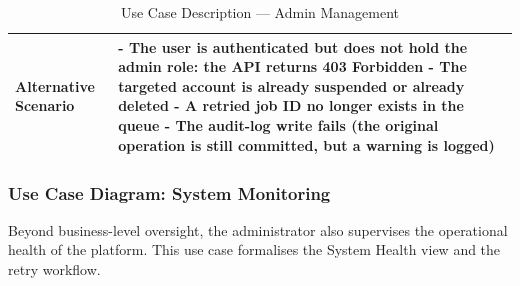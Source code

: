\begin{table}[H]
\begin{tabular}{|p{4cm}|p{10cm}|}
\textbf{Alternative Scenario} &
- The user is authenticated but does not hold the admin role: the API returns 403 Forbidden \newline
- The targeted account is already suspended or already deleted \newline
- A retried job ID no longer exists in the queue \newline
- The audit-log write fails (the original operation is still committed, but a warning is logged) \\ \hline

\end{tabular}
\caption{Use Case Description --- Admin Management}
\label{tab:admin-management}
\end{table}

\subsubsection*{Use Case Diagram: System Monitoring}

Beyond business-level oversight, the administrator also supervises the operational health of the platform. This use case formalises the System Health view and the retry workflow.

